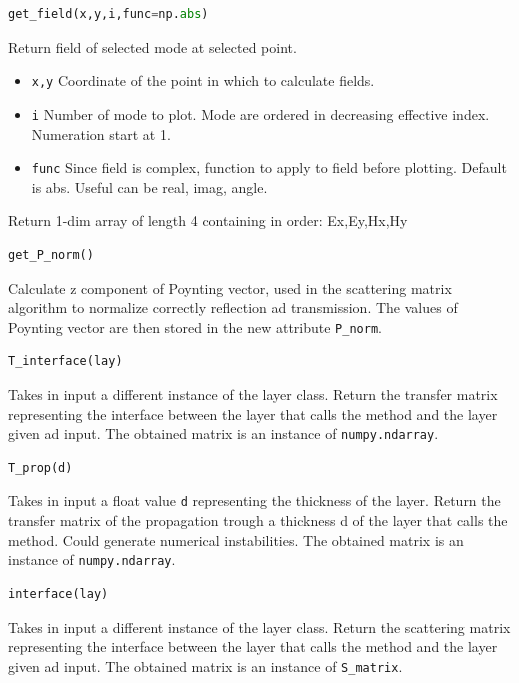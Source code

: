 \documentclass[a4paper,10pt]{report}
\begin{document}
\begin{lstlisting}[language=Python,basicstyle=\ttfamily\Large]
get_field(x,y,i,func=np.abs)
\end{lstlisting}
Return field of selected mode at selected point. 
\begin{itemize}[noitemsep,topsep=0pt,parsep=0pt,partopsep=0pt]
\item \texttt{x,y} Coordinate of the point in which to calculate fields.
\item \texttt{i} Number of mode to plot. Mode are ordered in decreasing effective index. Numeration start at 1.
\item \texttt{func} Since field is complex, function to apply to field before plotting. Default is abs. Useful can be real, imag, angle. 
\end{itemize}
Return 1-dim array of length 4 containing in order: Ex,Ey,Hx,Hy

\begin{lstlisting}[language=Python,basicstyle=\ttfamily\Large]
get_P_norm()
\end{lstlisting}
Calculate z component of Poynting vector, used in the scattering matrix algorithm to normalize correctly reflection ad transmission.
The values of Poynting vector are then stored in the new attribute \texttt{P\_norm}.

\begin{lstlisting}[language=Python,basicstyle=\ttfamily\Large]
T_interface(lay)
\end{lstlisting}
Takes in input a different instance of the layer class. Return the transfer matrix representing the interface between the layer that calls the method and the layer given ad input.  The obtained matrix is an instance of \texttt{numpy.ndarray}. 

\begin{lstlisting}[language=Python,basicstyle=\ttfamily\Large]
T_prop(d)
\end{lstlisting}
Takes in input a float value \texttt{d} representing the thickness of the layer. Return the transfer matrix of the propagation trough a thickness d of the layer that calls the method. Could generate numerical instabilities.  The obtained matrix is an instance of \texttt{numpy.ndarray}. 

\begin{lstlisting}[language=Python,basicstyle=\ttfamily\Large]
interface(lay)
\end{lstlisting}
Takes in input a different instance of the layer class. Return the scattering matrix representing the interface between the layer that calls the method and the layer given ad input.  The obtained matrix is an instance of \texttt{S\_matrix}. 
\end{document}
